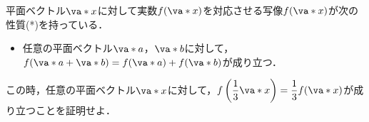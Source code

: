 平面ベクトル$\va*{x}$に対して実数$f(\va*{x})$を対応させる写像$f(\va*{x})$が次の性質(*)を持っている．
\begin{itemize}
  \item[(*)] 任意の平面ベクトル$\va*{a}$，$\va*{b}$に対して，$f(\va*{a}+\va*{b})=f(\va*{a})+f(\va*{b})$が成り立つ．
\end{itemize}
この時，任意の平面ベクトル$\va*{x}$に対して，$f\left(\dfrac{1}{3}\va*{x}\right)=\dfrac{1}{3}f(\va*{x})$が成り立つことを証明せよ．

